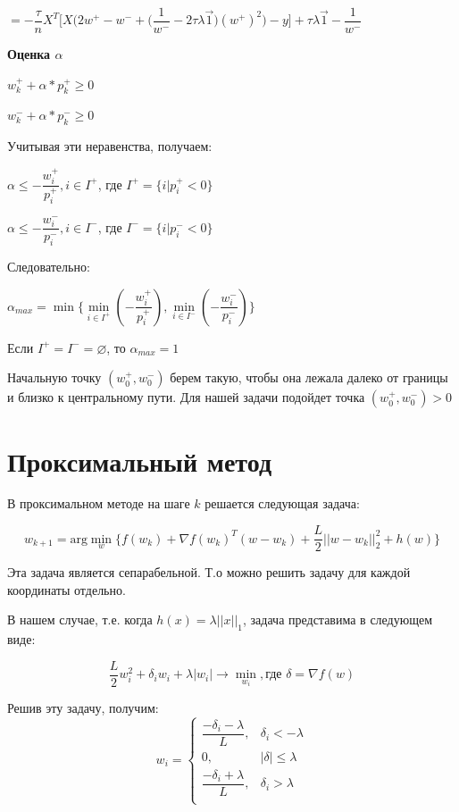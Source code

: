 \documentclass[12pt, a4paper]{article}
\begin{document}
    $= -\dfrac{\tau}{n} X^T \Big[ X\Big( 2w^+ - w^- + \Big(\dfrac{1}{w^-} - 2\tau\lambda\vec{1}\Big) (w^+)^2 \Big) -y \Big] + \tau\lambda\vec{1} - \dfrac{1}{w^-}$

    \medskip
    \textbf{Оценка $\alpha$}

    $w_k^+ + \alpha * p_k^+ \geq 0$

    $w_k^- + \alpha * p_k^- \geq 0$

    Учитывая эти неравенства, получаем:

    $\alpha \leq -\dfrac{w_i^+}{p_i^+}, i \in I^+$, где $I^+ = \{i | p_i^+ < 0\}$

    $\alpha \leq -\dfrac{w_i^-}{p_i^-}, i \in I^-$, где $I^- = \{i | p_i^- < 0\}$

    Следовательно:

    $\alpha_{max} = \min \{\min\limits_{i \in I^+} (-\dfrac{w_i^+}{p_i^+}), \min\limits_{i \in I^-} (-\dfrac{w_i^-}{p_i^-})\}$

    Если $I^+ = I^- = \varnothing$, то $\alpha_{max} = 1$

    \medskip

    Начальную точку $(w_0^+, w_0^-)$ берем такую, чтобы она лежала далеко от границы и близко к центральному пути. Для нашей задачи подойдет точка $(w_0^+, w_0^-) > 0$


    \section{Проксимальный метод}

    В проксимальном методе на шаге $k$ решается следующая задача:

    $$w_{k+1} = \text{arg}\min\limits_{w} \Big\{f(w_k) + \nabla f(w_k)^T(w - w_k) + \dfrac{L}{2} ||w - w_k||_2^2 + h(w)\Big\}$$

    Эта задача является сепарабельной. Т.о можно решить задачу для каждой координаты отдельно.

    В нашем случае, т.е. когда $h(x) = \lambda ||x||_1$, задача представима в следующем виде:

    $$\dfrac{L}{2} w_i^2 + \delta_i w_i + \lambda |w_i| \to \min\limits_{w_i}, \text{где } \delta = \nabla f(w)$$

    Решив эту задачу, получим:
    $$w_i =
    \begin{cases}
        \dfrac{-\delta_i - \lambda}{L}, & \delta_i < -\lambda \\
        0, & |\delta| \leq \lambda \\
        \dfrac{-\delta_i + \lambda}{L}, & \delta_i > \lambda \\
    \end{cases}$$
\end{document}
